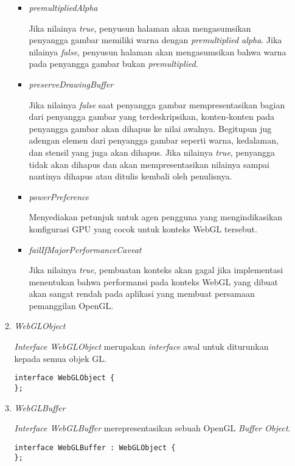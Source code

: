 \documentclass[a4paper,twoside]{article}
\begin{document}
\begin{enumerate}
\begin{enumerate}
\begin{itemize}
	\item {\it premultipliedAlpha}
	
	Jika nilainya {\it true}, penyusun halaman akan mengasumsikan penyangga gambar memiliki warna dengan {\it premultiplied alpha}. Jika nilainya {\it false}, penyusun halaman akan mengasumsikan bahwa warna pada penyangga gambar bukan {\it premultiplied}.
	
	\item {\it preserveDrawingBuffer}
	
	Jika nilainya {\it false} saat penyangga gambar mempresentasikan bagian dari penyangga gambar yang terdeskripsikan, konten-konten pada penyangga gambar akan dihapus ke nilai awalnya. Begitupun jug adengan elemen dari penyangga gambar seperti warna, kedalaman, dan stensil yang juga akan dihapus. Jika nilainya {\it true}, penyangga tidak akan dihapus dan akan mempresentasikan nilainya sampai nantinya dihapus atau ditulis kembali oleh penulisnya.
	
	\item {\it powerPreference}
	
	Menyediakan petunjuk untuk agen pengguna yang mengindikasikan konfigurasi GPU yang cocok untuk konteks WebGL tersebut.
	
	\item {\it failIfMajorPerformanceCaveat}
	
	Jika nilainya {\it true}, pembuatan konteks akan gagal jika implementasi menentukan bahwa performansi pada konteks WebGL yang dibuat akan sangat rendah pada aplikasi yang membuat persamaan pemanggilan OpenGL.
	
	\end{itemize}
	
\item {\it WebGLObject}

	{\it Interface WebGLObject} merupakan {\it interface} awal untuk diturunkan kepada semua objek GL.
	\begin{lstlisting}[caption={{\it Interface} awal pada WebGL.}, captionpos=b]
interface WebGLObject {
};
	\end{lstlisting}
	
\item {\it WebGLBuffer} 
	
	{\it Interface WebGLBuffer} merepresentasikan sebuah OpenGL {\it Buffer Object}.
	\begin{lstlisting}[caption={{\it Buffer Object} pada OpenGL.}, captionpos=b]
interface WebGLBuffer : WebGLObject {
};
	\end{lstlisting}
	

\end{enumerate}
\end{enumerate}
\end{document}
